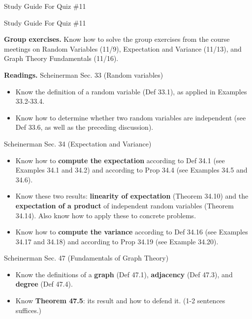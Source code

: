 \documentclass[10pt]{beamer}
\begin{document}
\begin{frame}[standout]
Study Guide For Quiz \#11
\end{frame}



\begin{frame}{Study Guide For Quiz \#11}
\scriptsize 

\colorbox{yellow!20}{\textbf{Group exercises.}} Know how to solve the group exercises from the course meetings on Random Variables (11/9), Expectation and Variance (11/13), and Graph Theory Fundamentals (11/16).

\vfill 
\colorbox{red!20}{\textbf{Readings.}}    Scheinerman Sec. 33 (Random variables)
\vspace{-.2cm}
\begin{itemize}
\item Know the definition of a random variable (Def 33.1), as applied in Examples 33.2-33.4.
\item Know how to determine whether two random variables are independent (see Def 33.6, as well as the preceding discussion).
\end{itemize}


Scheinerman Sec. 34 (Expectation and Variance)
\vspace{-.2cm}
\begin{itemize}
\item Know how to \textbf{compute the expectation} according to Def 34.1 (see Examples 34.1 and 34.2) and according to Prop 34.4 (see Examples 34.5 and 34.6).
\item Know these two results: \textbf{linearity of expectation} (Theorem 34.10) and the \textbf{expectation of a product} of independent random variables (Theorem 34.14). Also know how to apply these to concrete problems.
\item Know how to \textbf{compute the variance} according to Def 34.16 (see Examples 34.17 and 34.18) and according to Prop 34.19 (see Example 34.20). 
\end{itemize}

Scheinerman Sec. 47 (Fundamentals of Graph Theory)
\vspace{-.2cm}
\begin{itemize}
\item Know the definitions of a \textbf{graph} (Def 47.1), \textbf{adjacency} (Def 47.3), and \textbf{degree} (Def 47.4). 
\item Know \textbf{Theorem 47.5}: its result and how to defend it. (1-2 sentences suffices.)
\end{itemize}

\end{frame}
\end{document}
